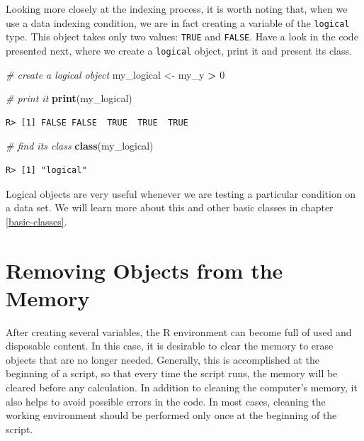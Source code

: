 \documentclass[
  12pt,
]{book}
\newenvironment{Shaded}{\begin{snugshade}}{\end{snugshade}}
\newcommand{\CommentTok}[1]{\textcolor[rgb]{0.37,0.37,0.37}{\textit{#1}}}
\newcommand{\DecValTok}[1]{\textcolor[rgb]{0.06,0.06,0.06}{#1}}
\newcommand{\KeywordTok}[1]{\textcolor[rgb]{0.27,0.27,0.27}{\textbf{#1}}}
\newcommand{\NormalTok}[1]{#1}
\newcommand{\OperatorTok}[1]{\textcolor[rgb]{0.43,0.43,0.43}{\textbf{#1}}}
\newcommand{\StringTok}[1]{\textcolor[rgb]{0.5,0.5,0.5}{#1}}
\begin{document}
Looking more closely at the indexing process, it is worth noting that, when we use a data indexing condition, we are in fact creating a variable of the \texttt{logical} type. This object takes only two values: \texttt{TRUE} and \texttt{FALSE}. Have a look in the code presented next, where we create a \texttt{logical} object, print it and present its class.

\begin{Shaded}
\begin{Highlighting}[]
\CommentTok{# create a logical object}
\NormalTok{my_logical <-}\StringTok{ }\NormalTok{my_y }\OperatorTok{>}\StringTok{ }\DecValTok{0}

\CommentTok{# print it}
\KeywordTok{print}\NormalTok{(my_logical)}
\end{Highlighting}
\end{Shaded}

\begin{verbatim}
R> [1] FALSE FALSE  TRUE  TRUE  TRUE
\end{verbatim}

\begin{Shaded}
\begin{Highlighting}[]
\CommentTok{# find its class}
\KeywordTok{class}\NormalTok{(my_logical)}
\end{Highlighting}
\end{Shaded}

\begin{verbatim}
R> [1] "logical"
\end{verbatim}

Logical objects are very useful whenever we are testing a particular condition on a data set. We will learn more about this and other basic classes in chapter \ref{basic-classes}.

\hypertarget{removing-objects-from-the-memory}{%
\section{Removing Objects from the Memory}\label{removing-objects-from-the-memory}}

After creating several variables, the R environment can become full of used and disposable content. In this case, it is desirable to clear the memory to erase objects that are no longer needed. Generally, this is accomplished at the beginning of a script, so that every time the script runs, the memory will be cleared before any calculation. In addition to cleaning the computer's memory, it also helps to avoid possible errors in the code. In most cases, cleaning the working environment should be performed only once at the beginning of the script.
\end{document}
